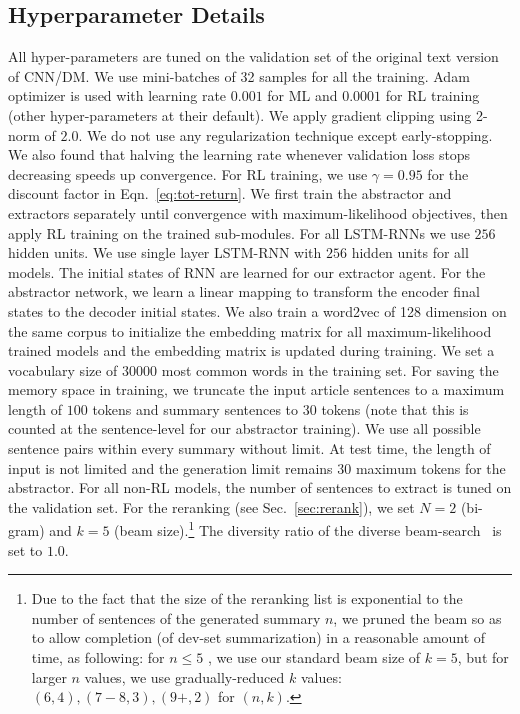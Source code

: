 \documentclass[11pt,a4paper]{article}
\def\secref#1{Sec.~\ref{#1}}
\def\eqnref#1{Eqn.~\ref{#1}}
\begin{document}
\subsection{Hyperparameter Details}
\label{sec:detail}
All hyper-parameters are tuned on the validation set of the original text version of CNN/DM.
We use mini-batches of 32 samples for all the training. 
Adam optimizer \citep{DBLP:journals/corr/KingmaB14}
is used with learning rate $0.001$ for ML and $0.0001$ for RL training (other hyper-parameters at their default).
We apply gradient clipping \citep{pmlr-v28-pascanu13} using 2-norm of $2.0$.
We do not use any regularization technique except early-stopping.
We also found that halving the learning rate whenever validation loss stops decreasing speeds up convergence.
For RL training, we use $\gamma = 0.95$ for the discount factor in \eqnref{eq:tot-return}.
We first train the abstractor and extractors separately until convergence with 
maximum-likelihood objectives, then apply RL training on the trained sub-modules.
For all LSTM-RNNs we use $256$ hidden units. We use single layer LSTM-RNN with $256$ hidden units for all models.
The initial states of RNN are learned for our extractor agent.
For the abstractor network, we learn a linear mapping to 
transform the encoder final states to the decoder initial states.
We also train a word2vec \citep{NIPS2013_word2vec} of 128 dimension
on the same corpus to initialize the embedding matrix for all maximum-likelihood trained models and the embedding matrix is updated during training.
We set a vocabulary size of $30000$ most common words in the training set.
For saving the memory space in training, we truncate the input article sentences to a maximum length of $100$ tokens and summary sentences to $30$ tokens (note that this is counted at the sentence-level for our abstractor training).
We use all possible sentence pairs within every summary without limit.
At test time, the length of input is not limited and the generation limit remains $30$ maximum tokens for the abstractor.
For all non-RL models, the number of sentences to extract is tuned on the validation set.
For the reranking (see \secref{sec:rerank}), we set $N = 2$ (bi-gram) and $k = 5$ (beam size).\footnote{Due to the fact that the size of the reranking list is exponential to the number of sentences of the generated summary $n$, we pruned the beam so as to allow completion (of dev-set summarization) in a reasonable amount of time, as following: for $n \leq 5$ , we use our standard beam size of $k = 5$, but for larger $n$ values, we use gradually-reduced $k$ values: $(6, 4), (7-8, 3), (9+, 2)$ for $(n, k)$.}
The diversity ratio of the diverse beam-search~\cite{diverse} is set to $1.0$.
\end{document}
